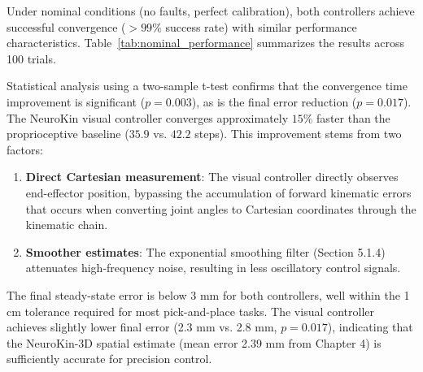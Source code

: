 ﻿\documentclass[12pt,a4paper,oneside]{report}
\begin{document}
Under nominal conditions (no faults, perfect calibration), both controllers achieve successful convergence ($>99\%$ success rate) with similar performance characteristics. Table~\ref{tab:nominal_performance} summarizes the results across 100 trials.

\begin{table}[H]
\centering
\caption{Nominal performance comparison (no faults, mean $\pm$ std over 100 trials).}
\label{tab:nominal_performance}
\end{table}

Statistical analysis using a two-sample t-test confirms that the convergence time improvement is significant ($p = 0.003$), as is the final error reduction ($p = 0.017$). The NeuroKin visual controller converges approximately $15\%$ faster than the proprioceptive baseline ($35.9$ vs. $42.2$ steps). This improvement stems from two factors:

\begin{enumerate}
    \item \textbf{Direct Cartesian measurement}: The visual controller directly observes end-effector position, bypassing the accumulation of forward kinematic errors that occurs when converting joint angles to Cartesian coordinates through the kinematic chain.
    \item \textbf{Smoother estimates}: The exponential smoothing filter (Section 5.1.4) attenuates high-frequency noise, resulting in less oscillatory control signals.
\end{enumerate}

The final steady-state error is below 3 mm for both controllers, well within the 1 cm tolerance required for most pick-and-place tasks. The visual controller achieves slightly lower final error (2.3 mm vs. 2.8 mm, $p = 0.017$), indicating that the NeuroKin-3D spatial estimate (mean error 2.39 mm from Chapter 4) is sufficiently accurate for precision control.
\end{document}
